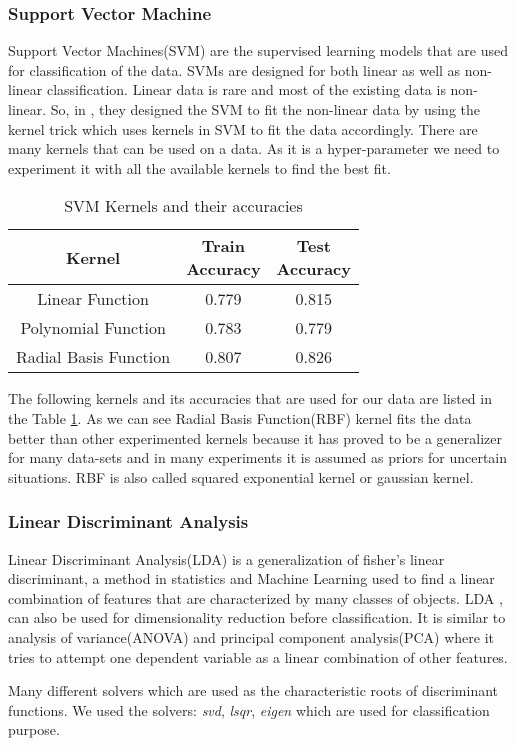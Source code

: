 \documentclass[conference]{IEEEtran}
\begin{document}
\subsubsection*{Support Vector Machine}
Support Vector Machines(SVM) are the supervised learning models that are used for classification of the data. SVMs are designed for both linear as well as non-linear classification. Linear data is rare and most of the existing data is non-linear. So, in \cite{svm}, they designed the SVM to fit the non-linear data by using the kernel trick which uses kernels in SVM to fit the data accordingly. There are many kernels that can be used on a data. As it is a hyper-parameter we need to experiment it with all the available kernels to find the best fit.
\begin{table}[ht]
\centering
 \begin{tabular}{|c| c c|}
 \hline
 Kernel  & \thead{Train \\ Accuracy} & \thead{Test \\ Accuracy} \\ [0.5ex]
 \hline
 Linear Function & 0.779 & 0.815\\

 Polynomial Function & 0.783 & 0.779\\

 Radial Basis Function & 0.807 & 0.826\\
 \hline
\end{tabular}
\vspace*{0.25cm}
\caption{SVM Kernels and their accuracies}
\label{table:svm}
\end{table}
\par
The following kernels and its accuracies that are used for our data are listed in the Table \ref{table:svm}. As we can see Radial Basis Function(RBF) kernel fits the data better than other experimented kernels because it has proved to be a generalizer for many data-sets and in many experiments it is assumed as priors for uncertain situations. RBF is also called squared exponential kernel or gaussian kernel.

\subsubsection*{Linear Discriminant Analysis}
Linear Discriminant Analysis(LDA) is a generalization of fisher's linear discriminant, a method in statistics and Machine Learning used to find a linear combination of features that are characterized by many classes of objects. LDA \cite{lda}, can also be used for dimensionality reduction before classification. It is similar to analysis of variance(ANOVA) and principal component analysis(PCA) where it tries to attempt one dependent variable as a linear combination of other features.
\par
Many different solvers which are used as the characteristic roots of discriminant functions. We used the solvers: \textit{svd},  \textit{lsqr}, \textit{eigen} which are used for classification purpose.
\end{document}
